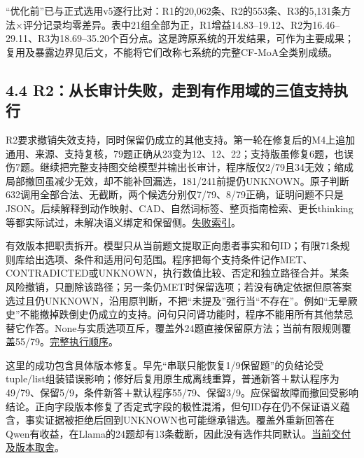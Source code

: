\documentclass[
  11pt,
  a4paper,
]{article}
\begin{document}
``优化前''已与正式选用v5逐行比对：R1的20,062条、R2的553条、R3的5,131条方法×评分记录均零差异。表中21组全部为正，R1增益14.83--19.12、R2为16.46--29.11、R3为18.69--35.20个百分点。这是跨原系统的开发结果，可作为主要成果；复用及暴露边界见后文，不能将它们改称七系统的完整CF-MoA全类别成绩。

\subsection{4.4
R2：从长审计失败，走到有作用域的三值支持执行}\label{r2ux4eceux957fux5ba1ux8ba1ux5931ux8d25ux8d70ux5230ux6709ux4f5cux7528ux57dfux7684ux4e09ux503cux652fux6301ux6267ux884c}

R2要求撤销失效支持，同时保留仍成立的其他支持。第一轮在修复后的M4上追加通用、来源、支持复核，79题正确从23变为12、12、22；支持版虽修复6题，也误伤7题。继续把完整支持图交给模型并输出长审计，程序版仅2/79且34无效；缩成局部撤回虽减少无效，却不能补回漏选，181/241前提仍UNKNOWN。原子判断632调用全部合法、无截断，两个候选分别仅7/79、8/79正确，证明问题不只是JSON。后续解释到动作映射、CAD、自然词标签、整页指南检索、更长thinking等都实际试过，未解决语义绑定和保留侧。\href{https://github.com/xiotakut/cf_mrg/blob/main/papers/2026-10-02_cf_moa/author_dossier/records/research/r2_support_head.md\#L488}{失败索引}。

有效版本把职责拆开。模型只从当前题文提取正向患者事实和句ID；有限71条规则库给出选项、条件和适用问句范围。程序把每个支持条件记作MET、CONTRADICTED或UNKNOWN，执行数值比较、否定和独立路径合并。某条风险撤销，只删除该路径；另一条仍MET时保留选项；若没有确定依据但原答案选过且仍UNKNOWN，沿用原判断，不把``未提及''强行当``不存在''。例如``无晕厥史''不能撤掉跌倒史仍成立的支持。问句只问肾功能时，程序不能用所有其他禁忌替它作答。None与实质选项互斥，覆盖外24题直接保留原方法；当前有限规则覆盖55/79。\href{https://github.com/xiotakut/cf_mrg/blob/main/papers/2026-10-02_cf_moa/author_dossier/records/research/r2_support_head.md\#L47}{完整执行顺序}。

这里的成功包含具体版本修复。早先``串联只能恢复1/9保留题''的负结论受tuple/list组装错误影响；修好后复用原生成离线重算，普通新答＋默认程序为49/79、保留5/9，条件新答＋默认程序55/79、保留3/9。应保留故障而撤回受影响结论。正向字段版本修复了否定式字段的极性混淆，但句ID存在仍不保证语义蕴含，事实证据被拒绝后回到UNKNOWN也可能继承错选。覆盖外重新回答在Qwen有收益，在Llama的24题却有13条截断，因此没有选作共同默认。\href{https://github.com/xiotakut/cf_mrg/blob/main/papers/2026-10-02_cf_moa/author_dossier/records/research/r2_support_head.md\#L526}{当前交付及版本取舍}。
\end{document}
